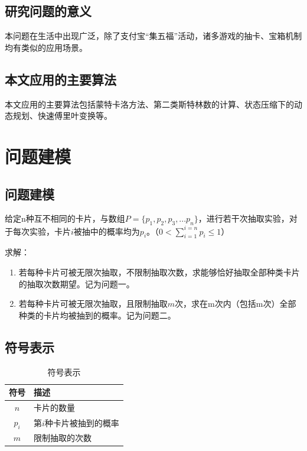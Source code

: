 \documentclass[master]{thesis-uestc}
\begin{document}
\section{研究问题的意义}

本问题在生活中出现广泛，除了支付宝“集五福”活动，诸多游戏的抽卡、宝箱机制均有类似的应用场景。

\section{本文应用的主要算法}

本文应用的主要算法包括蒙特卡洛方法、第二类斯特林数的计算、状态压缩下的动态规划、快速傅里叶变换等。


\chapter{问题建模}

\section{问题建模}

给定n种互不相同的卡片，与数组$P=\{p_1,p_2,p_3,...p_n\}$，进行若干次抽取实验，对于每次实验，卡片$i$被抽中的概率均为$p_i$。（$0< \sum\limits_{i=1}^{i=n}{p_i}\leq 1$）
\vspace{0.5cm}

求解：

\begin{enumerate}
\item 若每种卡片可被无限次抽取，不限制抽取次数，求能够恰好抽取全部种类卡片的抽取次数期望。记为问题一。
\item 若每种卡片可被无限次抽取，且限制抽取$m$次，求在m次内（包括m次）全部种类的卡片均被抽到的概率。记为问题二。
\end{enumerate}



\section{符号表示}
\begin{table}[!htbp]
    \centering
    \begin{tabular}{c l}
        \hline
        符号 & 描述 \\
        \hline \hline
        $n$ & 卡片的数量\\
        \hline
        $p_i$ & 第$i$种卡片被抽到的概率\\
        \hline
        $m$ & 限制抽取的次数\\
        \hline

    \end{tabular}
    \caption*{符号表示}
    \label{tab:my_label1}
\end{table}
\end{document}
